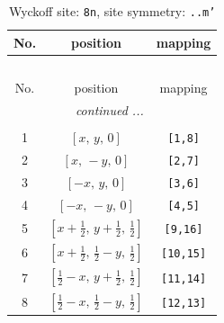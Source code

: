\documentclass[fleqn,8pt]{jsarticle}
\begin{document}
\begin{longtable}{ccc}
\caption{Wyckoff site: {\tt 8n}, site symmetry: {\tt ..m'}}
 \\
 \hline \hline
No. & position & mapping \\ \hline \endfirsthead

\multicolumn{2}{l}{\tablename\ \thetable{}} \\
 \hline \hline
No. & position & mapping \\ \hline \endhead

 \hline \hline
\multicolumn{2}{r}{\footnotesize\it continued ...} \\ \endfoot

 \hline \hline
\multicolumn{2}{r}{} \\ \endlastfoot

1 & $\left[ x,\, y,\, 0 \right]$ & {\tt [1,8]} \\ \hline
2 & $\left[ x,\, - y,\, 0 \right]$ & {\tt [2,7]} \\ \hline
3 & $\left[ - x,\, y,\, 0 \right]$ & {\tt [3,6]} \\ \hline
4 & $\left[ - x,\, - y,\, 0 \right]$ & {\tt [4,5]} \\ \hline
5 & $\left[ x + \frac{1}{2},\, y + \frac{1}{2},\, \frac{1}{2} \right]$ & {\tt [9,16]} \\ \hline
6 & $\left[ x + \frac{1}{2},\, \frac{1}{2} - y,\, \frac{1}{2} \right]$ & {\tt [10,15]} \\ \hline
7 & $\left[ \frac{1}{2} - x,\, y + \frac{1}{2},\, \frac{1}{2} \right]$ & {\tt [11,14]} \\ \hline
8 & $\left[ \frac{1}{2} - x,\, \frac{1}{2} - y,\, \frac{1}{2} \right]$ & {\tt [12,13]} \\
\end{longtable}
\renewcommand{\arraystretch}{1.2}
\end{document}
